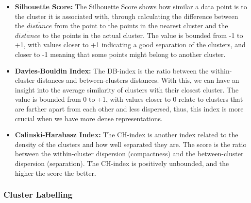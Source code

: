 \begin{itemize}
\item \textbf{Silhouette Score:} The Silhouette Score shows how similar a data point is to the cluster it is associated with, through calculating the difference between the $\overline{distance}$ from the point to the points in the nearest cluster and the $\overline{distance}$ to the points in the actual cluster. The value is bounded from -1 to +1, with values closer to +1 indicating a good separation of the clusters, and closer to -1 meaning that some points might belong to another cluster.
\item \textbf{Davies-Bouldin Index:} The DB-index is the ratio between the within-cluster distances and between-clusters distances. With this, we can have an insight into the average similarity of clusters with their closest cluster. The value is bounded from 0 to +1, with values closer to 0 relate to clusters that are farther apart from each other and less dispersed, thus, this index is more crucial when we have more dense representations.
\item \textbf{Calinski-Harabasz Index:} The CH-index is another index related to the density of the clusters and how well separated they are. The score is the ratio between the within-cluster dispersion (compactness) and the between-cluster dispersion (separation). The CH-index is positively unbounded, and the higher the score the better.
\end{itemize}

\subsubsection{Cluster Labelling}

\begin{table}
\begin{center}
{\caption{Best performing setups based on their internal validation and visualization of clustered data points.}\label{p6table:setups}}
\end{center}
\end{table}


